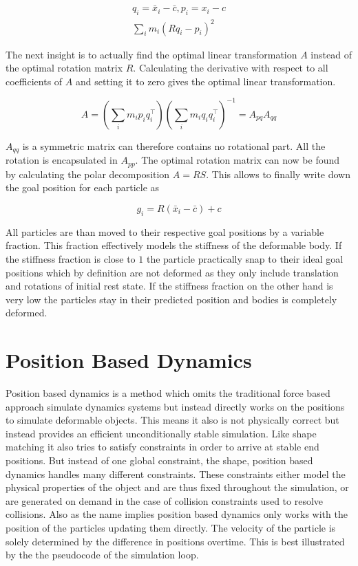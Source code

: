 \begin{gather}
q_i = \bar{x}_i - \bar{c}, p_i = x_i - c \\
\sum\limits_i m_i(Rq_i-p_i)^2
\label{eq:center_of_mass_shape_matching}
\end{gather}

The next insight is to actually find the optimal linear transformation \(A\) instead of the optimal rotation matrix \(R\).  Calculating the derivative with respect to all coefficients of \(A\) and setting it to zero gives the optimal linear transformation.

\begin{equation}
A = (\sum_i m_i p_i q_i^\top)(\sum_i m_i q_i q_i^\top)^{-1}=A_{pq}A_{qq}
\end{equation}

\(A_{qq}\) is a symmetric matrix can therefore contains no rotational part. All the rotation is encapsulated in \(A_{pp}\). The optimal rotation matrix can now be found by calculating the polar decomposition \(A = RS\). This allows to finally write down the goal position for each particle as

\begin{equation}
g_i = R(\bar{x}_i - \bar{c}) + c
\end{equation}

All particles are than moved to their respective goal positions by a variable fraction. This fraction effectively models the stiffness of the deformable body. If the stiffness fraction is close to $1$ the particle practically snap to their ideal goal positions which by definition are not deformed as they only include translation and rotations of initial rest state. If the stiffness fraction on the other hand is very low the particles stay in their predicted position and bodies is completely deformed.

\section{Position Based Dynamics}
\label{sec:position_based_dynamics}

Position based dynamics is a method which omits the traditional force based approach simulate dynamics systems but instead directly works on the positions to simulate deformable objects. This means it also is not physically correct but instead provides an efficient unconditionally stable simulation. Like shape matching it also tries to satisfy constraints in order to arrive at stable end positions. But instead of one global constraint, the shape, position based dynamics handles many different constraints. These constraints either model the physical properties of the object and are thus fixed throughout the simulation, or are generated on demand in the case of collision constraints used to resolve collisions. Also as the name implies position based dynamics only works with the position of the particles updating them directly. The velocity of the particle is solely determined by the difference in positions overtime. This is best illustrated by the the pseudocode of the simulation loop.

